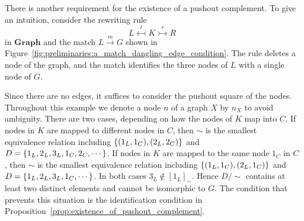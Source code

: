 There is another requirement for the existence of a pushout complement. To give an intuition, consider the rewriting rule
\[
L \overset{l}{\leftarrowtail} K \overset{r}{\rightarrowtail} R
\]
in \(\mathbf{Graph}\) and the match \(L \overset{m}{\rightarrow} G\) shown in Figure~\autoref{fig:preliminaries:a_match_dangling_edge_condition}. The rule deletes a node of the graph, and the match identifies the three nodes of \(L\) with a single node of \(G\).
    \begin{figure}[H]
        \centering
        \caption{} 
        \label{fig:preliminaries:a_match_dandfjasfkas} 
    \end{figure}
Since there are no edges, it suffices to consider the pushout square of the nodes. Throughout this example we denote a node \(n\) of a graph \(X\) by \(n_X\) to avoid ambiguity. There are two cases, depending on how the nodes of \(K\) map into \(C\). 
If nodes in $K$ are mapped to different nodes in $C$, then
        $\sim$ is the smallest equivalence relation including $\{(1_L,1_C),(2_L,2_C)\}$ and $D = \{1_L,2_L,3_L,1_C,2_C,\cdots\}$.
If nodes in $K$ are mapped to the same node $1_C$ in $C$, then
        $\sim$ is the smallest equivalence relation including $\{(1_L,1_C),(2_L,1_C)\}$ and $D = \{1_L,2_L,3_L,1_C,\cdots\}$.
In both cases \(3_L\notin[1_L]_\sim\). Hence \(D/\!\sim\) contains at least two distinct elements and cannot be isomorphic to \(G\). The condition that prevents this situation is the identification condition in Proposition~\autoref{prop:existence_of_pushout_complement}.

